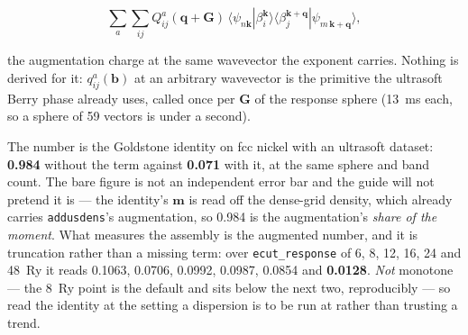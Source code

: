 \documentclass[11pt,a4paper]{article}
\newcommand{\code}[1]{\texttt{\small #1}}
\begin{document}
\begin{equation*}
\sum_a\sum_{ij} Q^a_{ij}(\mathbf q+\mathbf G)\,
\langle\psi_{n\mathbf k}|\beta^{\mathbf k}_i\rangle
\langle\beta^{\mathbf k+\mathbf q}_j|\psi_{m\,\mathbf k+\mathbf q}\rangle,
\end{equation*}

the augmentation charge at the same wavevector the exponent carries. Nothing is
derived for it: $q^a_{ij}(\mathbf b)$ at an arbitrary wavevector is the
primitive the ultrasoft Berry phase already uses, called once per $\mathbf G$ of
the response sphere (13~ms each, so a sphere of 59 vectors is under a second).

The number is the Goldstone identity on fcc nickel with an ultrasoft dataset:
\textbf{0.984} without the term against \textbf{0.071} with it, at the same
sphere and band count. The bare figure is not an independent error bar and the
guide will not pretend it is --- the identity's $\mathbf m$ is read off the
dense-grid density, which already carries \code{addusdens}'s augmentation, so
0.984 is the augmentation's \emph{share of the moment}. What measures the
assembly is the augmented number, and it is truncation rather than a missing
term: over \code{ecut\_response} of 6, 8, 12, 16, 24 and 48~Ry it reads 0.1063,
0.0706, 0.0992, 0.0987, 0.0854 and \textbf{0.0128}. \emph{Not} monotone --- the 8~Ry
point is the default and sits below the next two, reproducibly --- so read the
identity at the setting a dispersion is to be run at rather than trusting a
trend.
\end{document}
